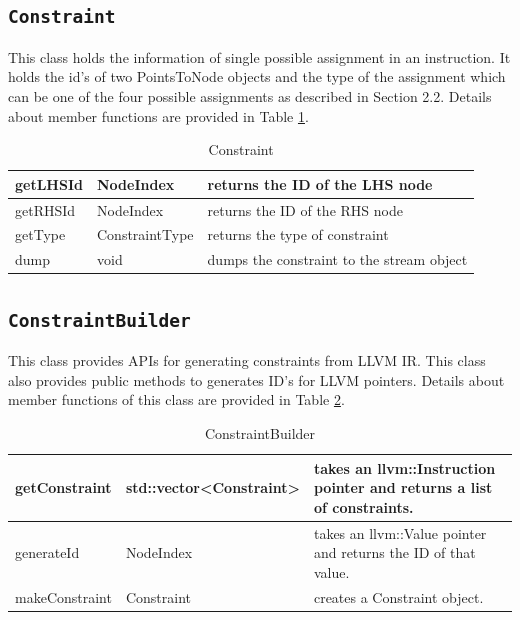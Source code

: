 \documentclass[a4paper,12pt]{report}
\begin{document}
\subsection{\texttt{Constraint}}
This class holds the information of single possible assignment in an 
instruction. It holds the id's of two PointsToNode objects and the type of the 
assignment which can be one of the four possible assignments as described 
in Section 2.2. Details about member functions are provided in Table \ref{constraint}.

\begin{table}[]
\centering
\caption{Constraint}
\label{constraint}
\begin{tabular}{|l|l|l|}
\hline
getLHSId                    & NodeIndex      & returns the ID of the LHS node            \\ \hline
getRHSId                    & NodeIndex      & returns the ID of the RHS node            \\ \hline
getType                     & ConstraintType & returns the type of constraint            \\ \hline
dump                        & void           & dumps the constraint to the stream object \\ \hline
\end{tabular}
\end{table}

\subsection{\texttt{ConstraintBuilder}}
This class provides APIs for generating constraints from LLVM IR. This class 
also provides public methods to generates ID's for LLVM pointers. Details about member functions of this class are provided in Table \ref{constraint-builder}.

\begin{table}[]
\centering
\caption{ConstraintBuilder}
\label{constraint-builder}
\begin{tabular}{|l|l|p{8cm}|}
\hline
getConstraint  & std::vector\textless Constraint\textgreater & takes an llvm::Instruction pointer and returns a list of constraints. \\ \hline
generateId     & NodeIndex                                  & takes an llvm::Value pointer and returns the ID of that value.        \\ \hline
makeConstraint & Constraint                                 & creates a Constraint object.                                          \\ \hline
\end{tabular}
\end{table}
\end{document}
